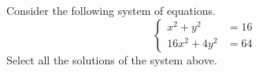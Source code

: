 \documentclass{ximera}
\author{Kenneth Berglund}
\begin{document}
\licenseSZ
\begin{exercise}
Consider the following system of equations.
$$
\begin{cases}
x^2 +y^2 & = 16 \\
16x^2 + 4y^2 & = 64
\end{cases}
$$
Select all the solutions of the system above.
\begin{selectAll}
\end{selectAll}

\end{exercise}
\end{document}
